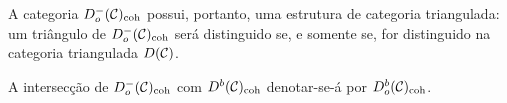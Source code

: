 A categoria $D_o^-(\mathcal C)_{\mathrm{coh}}$ possui, portanto, uma estrutura de categoria triangulada: um triângulo de $D_o^-(\mathcal C)_{\mathrm{coh}}$ será distinguido se, e somente se, for distinguido na categoria triangulada $D(\mathcal C)$.

A intersecção de $D_o^-(\mathcal C)_{\mathrm{coh}}$ com $D^b(\mathcal C)_{\mathrm{coh}}$ denotar-se-á por $D_o^b(\mathcal C)_{\mathrm{coh}}$.
